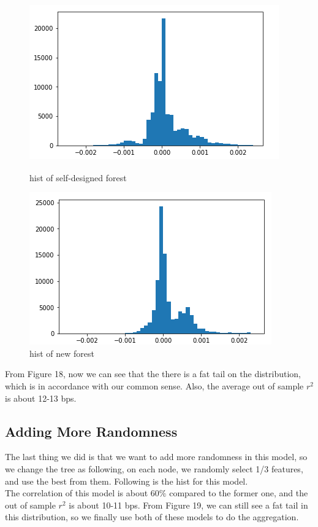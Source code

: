 \documentclass[onecolumn]{article}
\begin{document}
\begin{figure}[htbp]
\centering
\begin{minipage}[t]{0.48\textwidth}
\centering
\includegraphics[scale=0.4]{hist_our_forest.png}
\caption{hist of self-designed forest}
\end{minipage}
\begin{minipage}[t]{0.48\textwidth}
\centering
\includegraphics[scale=0.4]{hist_for_random.png}
\caption{hist of new forest}
\end{minipage}
\end{figure}

\indent From Figure 18, now we can see that the there is a fat tail on the distribution, which is in accordance with our common sense. Also, the average out of sample $r^2$ is about 12-13 bps.\\

\subsection{Adding More Randomness}
\indent The last thing we did is that we want to add more randomness in this model, so we change the tree as following, on each node, we randomly select 1/3 features, and use the best from them. Following is the hist for this model.\\
\indent The correlation of this model is about $60\% $ compared to the former one, and the out of sample $r^2$ is about 10-11 bps. From Figure 19, we can still see a fat tail in this distribution, so we finally use both of these models to do the aggregation.\\
\end{document}
